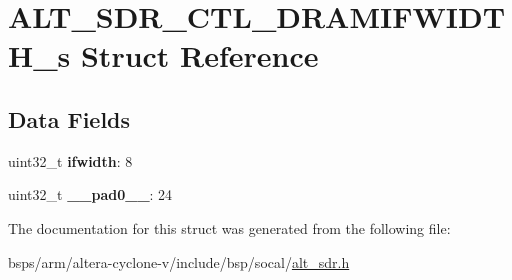 \hypertarget{structALT__SDR__CTL__DRAMIFWIDTH__s}{}\section{A\+L\+T\+\_\+\+S\+D\+R\+\_\+\+C\+T\+L\+\_\+\+D\+R\+A\+M\+I\+F\+W\+I\+D\+T\+H\+\_\+s Struct Reference}
\label{structALT__SDR__CTL__DRAMIFWIDTH__s}
\subsection*{Data Fields}
\begin{DoxyCompactItemize}
\item 
\mbox{\label{structALT__SDR__CTL__DRAMIFWIDTH__s_afb29796aa9cf535b90c9b3dcd486ee5c}} 
uint32\+\_\+t {\bfseries ifwidth}\+: 8
\item 
\mbox{\label{structALT__SDR__CTL__DRAMIFWIDTH__s_a346fe8d2a56a6c605deff5d24b65edaf}} 
uint32\+\_\+t {\bfseries \+\_\+\+\_\+pad0\+\_\+\+\_\+}\+: 24
\end{DoxyCompactItemize}


The documentation for this struct was generated from the following file\+:\begin{DoxyCompactItemize}
\item 
bsps/arm/altera-\/cyclone-\/v/include/bsp/socal/\mbox{\hyperlink{alt__sdr_8h}{alt\+\_\+sdr.\+h}}\end{DoxyCompactItemize}
